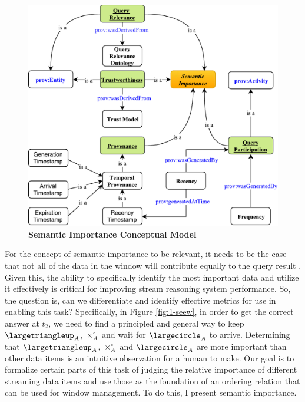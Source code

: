 \begin{figure}[!htbp]
	\centering
	\includegraphics[width=5in]{img/3-si.pdf}
	\caption{\textbf{Semantic Importance Conceptual Model}}
	\label{fig:3-si} 
\end{figure}

For the concept of semantic importance to be relevant, it needs to be the case that not all of the data in the window will contribute equally to the query result \cite{mileo2013streamrule}. 
Given this, the ability to specifically identify the most important data and utilize it effectively is critical for improving stream reasoning system performance. 
So, the question is, can we differentiate and identify effective metrics for use in enabling this task? 
Specifically, in Figure \ref{fig:1-seew}, in order to get the correct answer at $t_{2}$, we need to find a principled and general way to keep $\largetriangleup_{A}$, $\times^{\circ}_{A}$ and wait for $\largecircle_{A}$ to arrive. 
Determining that $\largetriangleup_{A}$, $\times^{\circ}_{A}$ and $\largecircle_{A}$ are more important than other data items is an intuitive observation for a human to make. 
Our goal is to formalize certain parts of this task of judging the relative importance of different streaming data items and use those as the foundation of an ordering relation that can be used for window management.
To do this, I present semantic importance.

